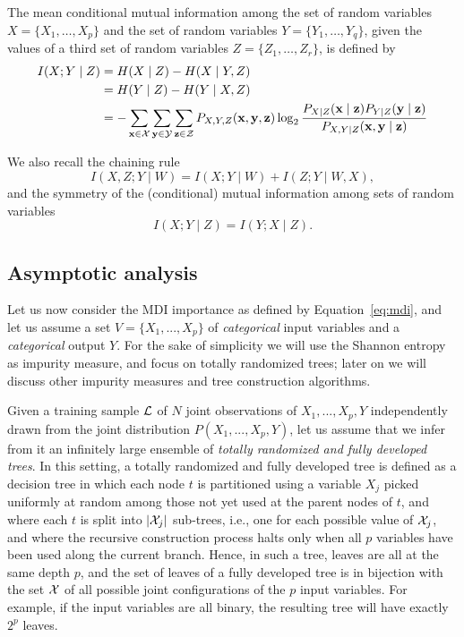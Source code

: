 The mean conditional mutual information among the set of random variables $X
=\{X_{1}, \ldots , X_{p}\}$ and the set of random variables $Y=\{Y_{1}, \ldots
, Y_{q}\}$, given the values of a third set of random variables $Z=\{Z_{1},
\ldots , Z_{r}\}$, is defined by
 \begin{align}
 I(X; Y \mid Z) &= H(X \mid Z) - H(X \mid Y, Z)\\
 & = H(Y \mid Z) - H(Y \mid X, Z) \nonumber\\
& = - \sum_{\mathbf{x} \in {\cal X}} \sum_{\mathbf{y} \in {\cal Y}} \sum_{\mathbf{z} \in {\cal Z}} P_{X, Y, Z} (\mathbf{x}, \mathbf{y}, \mathbf{z}) \log_{2} \frac{P_{X \mid Z}(\mathbf{x} \mid \mathbf{z}) P_{Y\mid Z}(\mathbf{y} \mid \mathbf{z})}{P_{X,Y \mid Z}(\mathbf{x},\mathbf{y} \mid \mathbf{z})}\nonumber
\end{align}

We also recall the chaining rule
\begin{equation}
I(X, Z ; Y \mid W ) = I(X; Y \mid W  ) + I( Z ; Y \mid W, X),
\end{equation}
and the symmetry of the (conditional) mutual information among sets of random variables
\begin{equation}
I(X ; Y \mid Z) = I(Y ;  X  \mid Z).
\end{equation}


\subsection{Asymptotic analysis}


Let us now consider the MDI  importance as defined by Equation~\ref{eq:mdi},
and let us assume a set $V= \{X_1, ..., X_p\}$  of {\em categorical} input
variables and a {\em categorical} output $Y$. For the sake of simplicity we
will  use the Shannon entropy as impurity measure, and focus on totally
randomized trees; later on we will discuss other impurity measures and tree
construction algorithms.

Given a training sample ${\cal L}$ of $N$ joint observations of $X_1, ..., X_p,
Y$ independently drawn from the joint distribution $P(X_1, ..., X_p, Y)$, let us
assume that we infer from it an infinitely large ensemble of \textit{totally
randomized and fully developed trees}. In this setting, a totally randomized and
fully developed tree is defined as a decision tree in which each node $t$ is
partitioned using a variable $X_j$ picked uniformly at random among those not
yet used at the parent nodes of $t$, and where each $t$ is split into $|{\cal
X}_j|$ sub-trees, i.e., one for each possible value of ${\cal X}_j$, and where
the recursive construction process halts only when all $p$ variables have been
used along the current branch.  Hence, in such a tree, leaves are all at the
same depth $p$, and the set of leaves of a fully developed tree is in bijection
with the set $\cal X$ of all possible joint configurations of the $p$ input
variables. For example, if the input variables are all binary, the resulting
tree will have exactly $2^{p}$ leaves.

